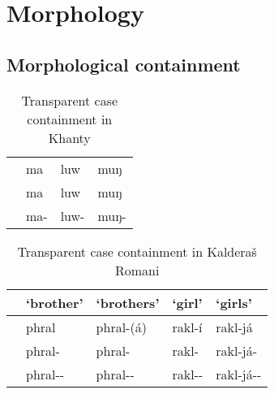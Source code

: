 \section{Morphology}

\subsection{Morphological containment}

\begin{table}[h]
  \center
	\caption {Transparent case containment in Khanty \citep[16]{nikolaeva1999}}
	\begin{minipage}{0.7\linewidth}
		\begin{tabularx}{\textwidth}{c *{3}{Z}}
		\toprule
              & 
              & 
              &                                \\
		\midrule
     & ma
              & luw
              & muŋ                                     \\
     & ma
              & luw
              & muŋ                           \\
     & ma-\textcolor{DG}{}
              & luw-\textcolor{DG}{}
              & muŋ-\textcolor{DG}{}  \\
		\bottomrule
		\end{tabularx}
	\end{minipage}
\end{table}



\begin{table}[h]
  \center
	\caption {Transparent case containment in Kalderaš Romani \citep[31-46]{boretzky1994}}
	\begin{minipage}{0.9\linewidth}
		\begin{tabularx}{\textwidth}{c *{4}{Z}}
		\toprule
              & `brother'
              & `brothers'
              & `girl'
              & `girls'                                   \\
		\midrule
     & phral
              & phral-(á)
              & rakl-í
              & rakl-já                                   \\
     & phral-
              & phral-
              & rakl-
              & rakl-já-                           \\
     & phral--\textcolor{DG}{}
              & phral--\textcolor{DG}{}
              & rakl--\textcolor{DG}{}
              & rakl-já--\textcolor{DG}{}  \\
		\bottomrule
		\end{tabularx}
	\end{minipage}
\end{table}


